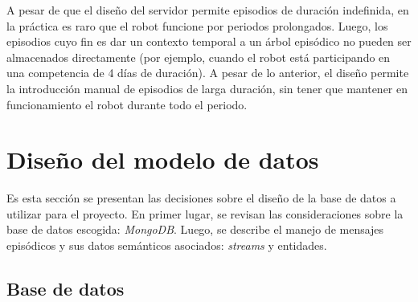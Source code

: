 A pesar de que el diseño del servidor permite episodios de duración indefinida, en la práctica es raro que el robot funcione por periodos prolongados. Luego, los episodios cuyo fin es dar un contexto temporal a un árbol episódico no pueden ser almacenados directamente (por ejemplo, cuando el robot está participando en una competencia de 4 días de duración). A pesar de lo anterior, el diseño permite la introducción manual de episodios de larga duración, sin tener que mantener en funcionamiento el robot durante todo el periodo.





\section{Diseño del modelo de datos}

Es esta sección se presentan las decisiones sobre el diseño de la base de datos a utilizar para el proyecto. En primer lugar, se revisan las consideraciones sobre la base de datos escogida: \textit{MongoDB}. Luego, se describe el manejo de mensajes episódicos y sus datos semánticos asociados: \textit{streams} y entidades.


\subsection{Base de datos}


